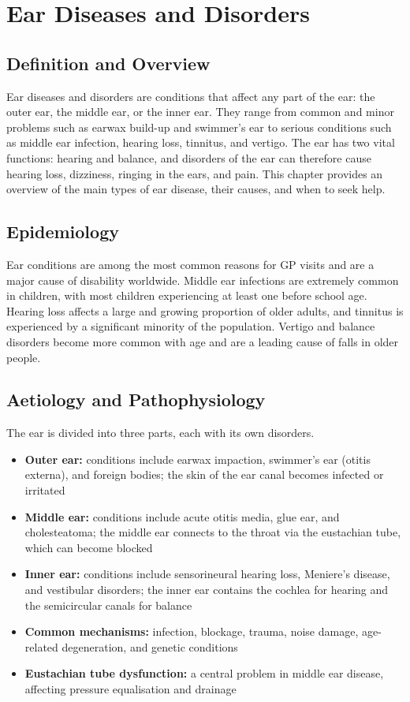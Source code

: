 \chapter{Ear Diseases and Disorders}

\section*{Definition and Overview}
Ear diseases and disorders are conditions that affect any part of the ear: the outer ear, the middle ear, or the inner ear. They range from common and minor problems such as earwax build-up and swimmer's ear to serious conditions such as middle ear infection, hearing loss, tinnitus, and vertigo. The ear has two vital functions: hearing and balance, and disorders of the ear can therefore cause hearing loss, dizziness, ringing in the ears, and pain. This chapter provides an overview of the main types of ear disease, their causes, and when to seek help.

\section*{Epidemiology}
Ear conditions are among the most common reasons for GP visits and are a major cause of disability worldwide. Middle ear infections are extremely common in children, with most children experiencing at least one before school age. Hearing loss affects a large and growing proportion of older adults, and tinnitus is experienced by a significant minority of the population. Vertigo and balance disorders become more common with age and are a leading cause of falls in older people.

\section*{Aetiology and Pathophysiology}
The ear is divided into three parts, each with its own disorders.
\begin{itemize}
    \item \textbf{Outer ear:} conditions include earwax impaction, swimmer's ear (otitis externa), and foreign bodies; the skin of the ear canal becomes infected or irritated
    \item \textbf{Middle ear:} conditions include acute otitis media, glue ear, and cholesteatoma; the middle ear connects to the throat via the eustachian tube, which can become blocked
    \item \textbf{Inner ear:} conditions include sensorineural hearing loss, Meniere's disease, and vestibular disorders; the inner ear contains the cochlea for hearing and the semicircular canals for balance
    \item \textbf{Common mechanisms:} infection, blockage, trauma, noise damage, age-related degeneration, and genetic conditions
    \item \textbf{Eustachian tube dysfunction:} a central problem in middle ear disease, affecting pressure equalisation and drainage
\end{itemize}

